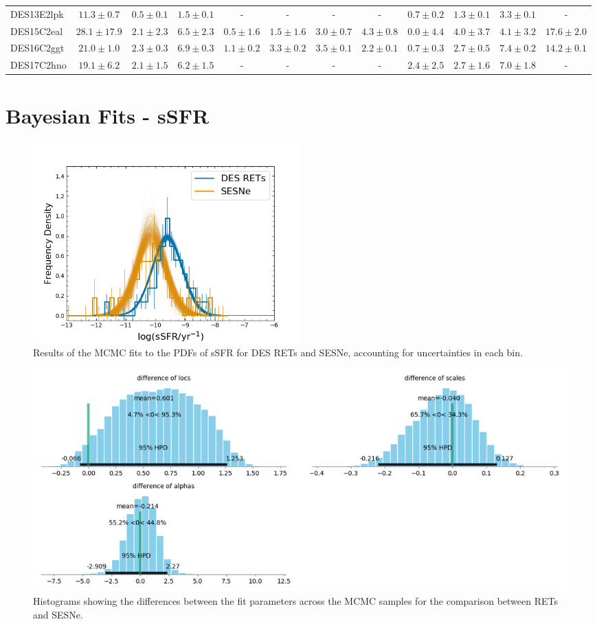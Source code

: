 \documentclass[fleqn,usenatbib,]{mnras}
\begin{document}
\begin{table}
\begin{tabular}{lccccccccccc}
DES13E2lpk &   $11.3 \pm 0.7$ &    $0.5 \pm 0.1$ &     $1.5 \pm 0.1$ &               - &               - &               - &               - &   $0.7 \pm 0.2$ &    $1.3 \pm 0.1$ &    $3.3 \pm 0.1$ &                - \\
DES15C2eal &  $28.1 \pm 17.9$ &    $2.1 \pm 2.3$ &     $6.5 \pm 2.3$ &   $0.5 \pm 1.6$ &   $1.5 \pm 1.6$ &   $3.0 \pm 0.7$ &   $4.3 \pm 0.8$ &   $0.0 \pm 4.4$ &    $4.0 \pm 3.7$ &    $4.1 \pm 3.2$ &   $17.6 \pm 2.0$ \\
DES16C2ggt &   $21.0 \pm 1.0$ &    $2.3 \pm 0.3$ &     $6.9 \pm 0.3$ &   $1.1 \pm 0.2$ &   $3.3 \pm 0.2$ &   $3.5 \pm 0.1$ &   $2.2 \pm 0.1$ &   $0.7 \pm 0.3$ &    $2.7 \pm 0.5$ &    $7.4 \pm 0.2$ &   $14.2 \pm 0.1$ \\
DES17C2hno &   $19.1 \pm 6.2$ &    $2.1 \pm 1.5$ &     $6.2 \pm 1.5$ &               - &               - &               - &               - &   $2.4 \pm 2.5$ &    $2.7 \pm 1.6$ &    $7.0 \pm 1.8$ &                - \\
\bottomrule
\end{tabular}
\end{table}

\newpage
\section{Bayesian Fits - sSFR}
\label{app:b}

\begin{figure}
\includegraphics[width=0.5\textwidth]{mc_figs/rets_s12_histfit_ssfr_final.png}
\caption{Results of the MCMC fits to the PDFs of sSFR for DES RETs and SESNe, accounting for uncertainties in each bin.
\label{fig:histfit_s12_ssfr}}
\end{figure}

\begin{figure}
\includegraphics[width=\textwidth]{mc_figs/rets_s12_param_diffs_ssfr_final.png}
\caption{Histograms showing the differences between the fit parameters across the MCMC samples for the comparison between RETs and SESNe. 
\label{fig:param_diffs}}
\end{figure}
\end{document}

